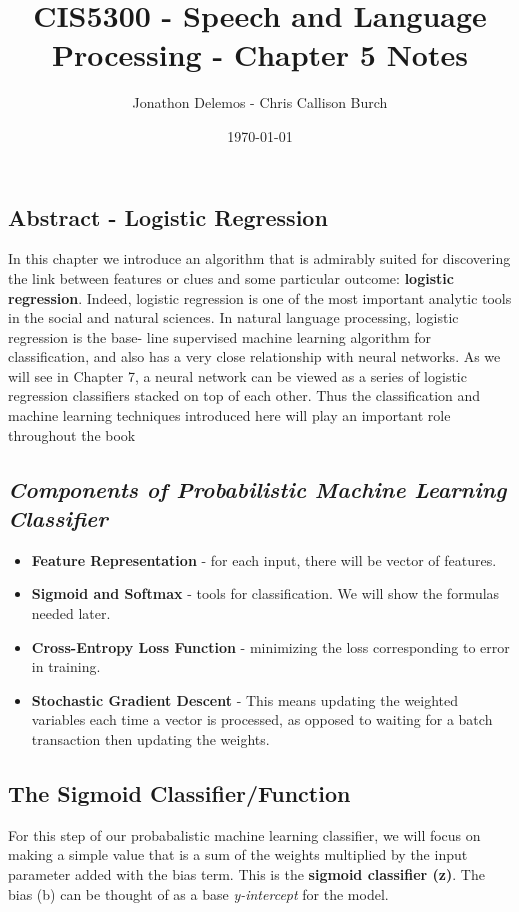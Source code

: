 \documentclass{article}
\title{CIS5300 - Speech and Language Processing - Chapter 5 Notes}
\author{Jonathon Delemos - Chris Callison Burch}
\date{\today}
\begin{document}
\maketitle

\subsection{Abstract - Logistic Regression}

In this chapter we introduce an algorithm that is admirably suited for discovering
the link between features or clues and some particular outcome: \textbf{logistic regression}.
Indeed, logistic regression is one of the most important analytic tools in the social
and natural sciences. In natural language processing, logistic regression is the base-
line supervised machine learning algorithm for classification, and also has a very
close relationship with neural networks. As we will see in Chapter 7, a neural network can be viewed as a series of logistic regression classifiers stacked on top of
each other. Thus the classification and machine learning techniques introduced here
will play an important role throughout the book


\subsection{\textit{Components of Probabilistic Machine Learning Classifier}}
\begin{itemize}
    \item \textbf{Feature Representation} - for each input, there will be  vector of features.
    \item \textbf{Sigmoid and Softmax} - tools for classification. We will show the formulas needed later.
    \item \textbf{Cross-Entropy Loss Function} - minimizing the loss corresponding to error in training.
    \item \textbf{Stochastic Gradient Descent} - This means updating the weighted variables each time a vector is processed, as opposed to waiting for a batch transaction then updating the weights.
\end{itemize}
\subsection{\textbf{The Sigmoid Classifier/Function}}
For this step of our probabalistic machine learning classifier, we will focus on making a simple value that is a sum
of the weights multiplied by the input parameter added with the bias term. This is the \textbf{sigmoid classifier (z)}. The bias (b) can be thought of as a base \textit{y-intercept} for the
model.
\end{document}
